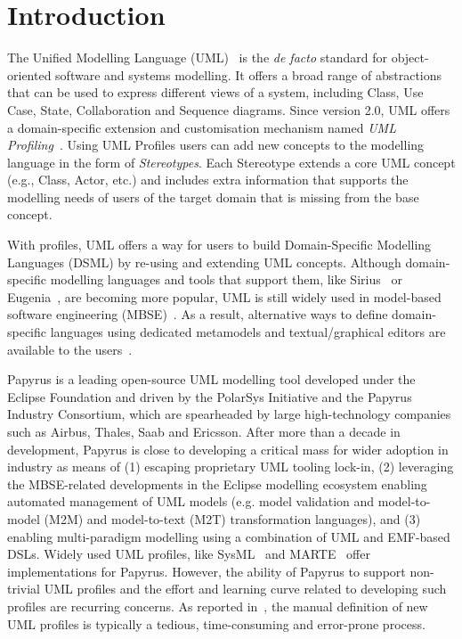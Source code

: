 \section{Introduction}
\label{sec:introduction}

The Unified Modelling Language (UML)~\cite{UML2015OMG} is the \emph{de facto} standard for object-oriented software and systems modelling. 
It offers a broad range of abstractions that can be used to express different views of a system, including Class, Use Case, State, Collaboration and Sequence diagrams. 
Since version 2.0, UML offers a domain-specific extension and customisation mechanism named  \emph{UML Profiling}~\cite{FuentesFernandez2004:UMLME}. 
Using UML Profiles users can add new concepts to the modelling language in the form of \textit{Stereotypes}. 
Each Stereotype extends a core UML concept (e.g., Class, Actor, etc.) and includes extra information that 
supports the modelling needs of users of the target domain that is missing from the base concept.

With profiles, UML offers a way for users to build Domain-Specific Modelling Languages (DSML) by re-using and extending UML concepts. 
Although domain-specific modelling languages and tools that support them, like Sirius~\cite{viyovic2014sirius} or Eugenia~\cite{kolovos2015eugenia}, are becoming more popular, UML is still widely used in model-based software 
engineering (MBSE)~\cite{erickson2007theoretical}. 
As a result, alternative ways to define domain-specific languages using dedicated metamodels and textual/graphical editors are available to the users~\cite{Bergmayr2014:MODELS,Pardillo2010:MODELS}. 

Papyrus \cite{lanusse2009papyrus} is a leading open-source UML modelling tool developed under the Eclipse Foundation and driven by the PolarSys Initiative and the Papyrus Industry Consortium, which are spearheaded by large high-technology companies such as Airbus, Thales, Saab and Ericsson. 
After more than a decade in development, Papyrus is close to developing a critical mass for wider adoption in industry as means of (1) escaping proprietary UML tooling lock-in, (2) leveraging the MBSE-related developments in the Eclipse modelling ecosystem enabling automated management of UML models (e.g. model validation and model-to-model (M2M) and model-to-text (M2T) transformation languages), and (3) enabling multi-paradigm modelling using a combination of UML and EMF-based DSLs. 
Widely used UML profiles, like SysML~\cite{friedenthal2014practical} and MARTE~\cite{omg2011marte} offer implementations for Papyrus. 
However, the ability of Papyrus to support non-trivial UML profiles and the effort and learning curve related to developing such profiles are recurring concerns. 
As reported in~\cite{Wimmer2009:IJWIS}, the manual definition of new UML profiles is typically a tedious, time-consuming and error-prone process.

